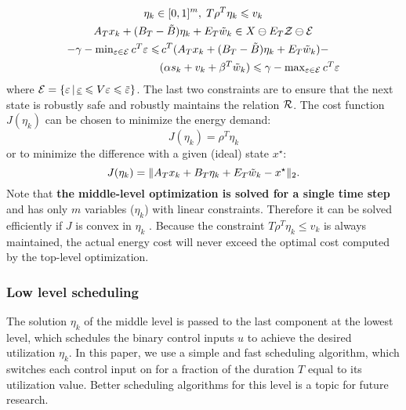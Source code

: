 \begin{gather*}
  \eta_{k} \in [0,1]^{m}, \; T \rho^{T} \eta_{k} \leqslant v_{k} \\
  A_{T} x_{k} + (B_{T} - \tilde{B}) \eta_{k} + E_{T} \tilde{w}_{k} \in X \ominus E_{T} \ZSet \ominus \ESet \\
  \begin{aligned}
    -\gamma - \textstyle\min_{\varepsilon \in \ESet} c^{T} \varepsilon %
    \leqslant & \, c^{T}(A_{T} x_{k} + (B_{T} - \tilde{B}) \eta_{k}
    + %
    E_{T} \tilde{w}_{k}) - \\
    & (\alpha s_{k} + v_{k} + \beta^{T} \tilde{w}_{k}) \leqslant \gamma
    - \textstyle\max_{\varepsilon \in \ESet} c^{T}
    \varepsilon %
  \end{aligned}
\end{gather*}
where $\ESet = \{\varepsilon \,|\, \underline{\varepsilon} \leqslant V \varepsilon \leqslant \overbar{\varepsilon}\}$.
The last two constraints are to ensure that the next state is robustly safe and robustly maintains the relation $\mathcal{R}$.
The cost function $J(\eta_{k})$ can be chosen to minimize the energy demand:
\begin{equation*}
  J(\eta_{k}) = \rho^{T} \eta_{k}
\end{equation*}
or to minimize the difference with a given (ideal) state $x^{\star}$:
\begin{equation*}
  J(\eta_{k}) = \| A_{T} x_{k} + B_{T} \eta_{k} + E_{T} \tilde{w}_{k} - x^{\star} \|_{2} \text.
\end{equation*}
%
Note that \textbf{the middle-level optimization is solved for a single time step} and has only $m$ variables ($\eta_{k}$) with linear constraints.
Therefore it can be solved efficiently if $J$ is convex in $\eta_{k}$ \cite{boydetal06co}.
%
Because the constraint $T \rho^{T} \eta_{k} \leqslant v_{k}$ is always maintained, the actual energy cost will never exceed the optimal cost computed by the top-level optimization.


\subsubsection{Low level scheduling}

The solution $\eta_{k}$ of the middle level is passed to the last component at the lowest level, which schedules the binary control inputs $u$ to achieve the desired utilization $\eta_{k}$.
In this paper, we use a simple and fast scheduling algorithm, which switches each control input on for a fraction of the duration $T$ equal to its utilization value. %
Better scheduling algorithms for this level is a topic for future research.

